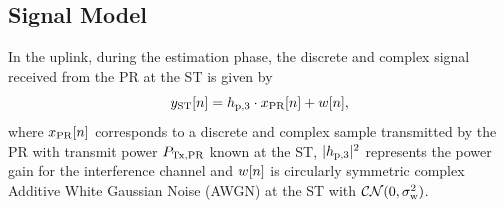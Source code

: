 
\subsection{Signal Model}
In the uplink, during the estimation phase, the discrete and complex signal received from the PR at the ST is given by
\begin{equation}
y_{\text{ST}}[n] = h_{\text{p,3}} \cdot x_{\text{PR}}[n] + w[n],
\label{eq:sys_mod_st}
\end{equation}
where $x_{\text{PR}}[n]$ corresponds to a discrete and complex sample transmitted by the PR with transmit power $P_{\text{Tx,PR}}$ known at the ST, $|h_{\text{p,3}}|^2$ represents the power gain for the interference channel and $w[n]$ is circularly symmetric complex Additive White Gaussian Noise (AWGN) at the ST with %
$\mathcal{CN}(0, \sigma^2_{\text{w}})$. %

